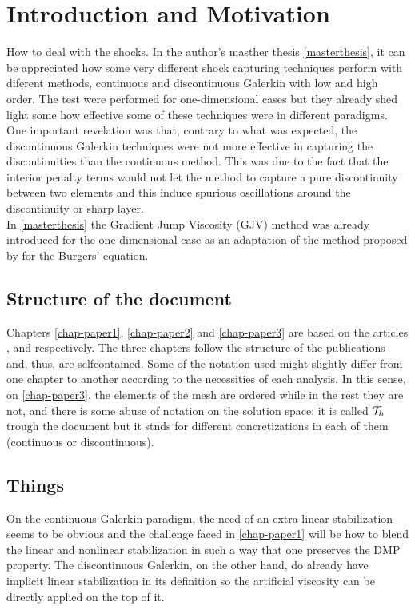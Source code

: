 \chapter{Introduction and Motivation}
\label{chap-intro}


How to deal with the shocks. In the {author's} masther thesis \ref{masterthesis}, it can be appreciated how some very different shock capturing techniques perform with diferent methods, continuous and discontinuous Galerkin with low and high order. The test were performed for one-dimensional cases but they already shed light some how effective some of these techniques were in different paradigms.\\

One important revelation was that, contrary to what was expected, the discontinuous Galerkin techniques were not more effective in capturing the discontinuities than the continuous method. This was due to the fact that the interior penalty terms would not let the method to capture a pure discontinuity between two elements and this induce spurious oscillations around the discontinuity or sharp layer.\\

In \ref{masterthesis} the Gradient Jump Viscosity (GJV) method was already introduced for the one-dimensional case as an adaptation of the method proposed by \cite{burman_nonlinear_2007} for the Burgers' equation.

\section{Structure of the document}
Chapters \ref{chap-paper1}, \ref{chap-paper2} and \ref{chap-paper3} are based on the  articles \cite{badia_stabilized_2012}, \cite{badia_discrete_2015} and \cite{paper3} respectively. The three chapters follow the structure of the publications and, thus, are selfcontained. Some of the notation used might slightly differ from one chapter to another according to the necessities of each analysis. In this sense, on \ref{chap-paper3}, the elements of the mesh are ordered while in the rest they are not, and there is some abuse of notation on the solution space: it is called $\mathcal{T}_h$ trough the document but it stnds for different concretizations in each of them (continuous or discontinuous). 

\section{Things}
On the continuous Galerkin paradigm, the need of an extra linear stabilization seems to be obvious and the challenge faced in \ref{chap-paper1} will be how to blend the linear and nonlinear stabilization in such a way that one preserves the DMP property. The discontinuous Galerkin, on the other hand, do already have implicit linear stabilization in its definition so the artificial viscosity can be directly applied on the top of it.